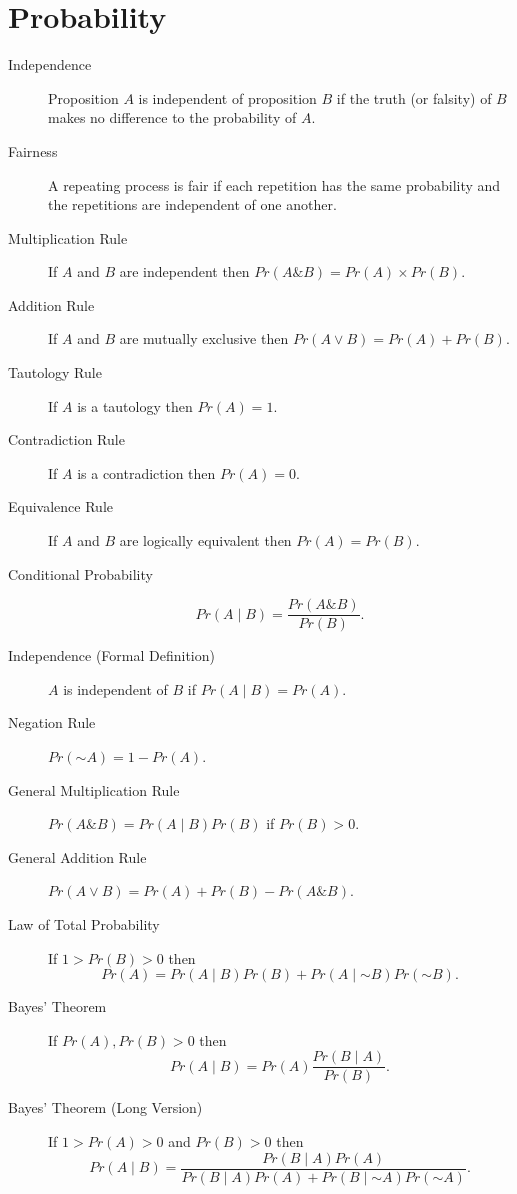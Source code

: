 \documentclass[justified]{tufte-book}
\newcommand{\given}{\mid}
\renewcommand{\neg}{\mathbin{\sim}}
\renewcommand{\wedge}{\mathbin{\&}}
\newcommand{\p}{Pr}
\theoremstyle{definition}
\theoremstyle{definition}
\theoremstyle{definition}
\theoremstyle{remark}
\begin{document}
\hypertarget{probability}{%
\section*{Probability}\label{probability}}

\begin{description}
\item[Independence]
Proposition \(A\) is independent of proposition \(B\) if the truth (or falsity) of \(B\) makes no difference to the probability of \(A\).
\item[Fairness]
A repeating process is fair if each repetition has the same probability and the repetitions are independent of one another.
\item[Multiplication Rule]
If \(A\) and \(B\) are independent then \(\p(A \wedge B) = \p(A) \times \p(B)\).
\item[Addition Rule]
If \(A\) and \(B\) are mutually exclusive then \(\p(A \vee B) = \p(A) + \p(B)\).
\item[Tautology Rule]
If \(A\) is a tautology then \(\p(A) = 1\).
\item[Contradiction Rule]
If \(A\) is a contradiction then \(\p(A) = 0\).
\item[Equivalence Rule]
If \(A\) and \(B\) are logically equivalent then \(\p(A) = \p(B)\).
\item[Conditional Probability]
\[\p(A \given B) = \frac{\p(A \wedge B)}{\p(B)}.\]
\item[Independence (Formal Definition)]
\(A\) is independent of \(B\) if \(\p(A \given B) = \p(A)\).
\item[Negation Rule]
\(\p(\neg A) = 1 - \p(A)\).
\item[General Multiplication Rule]
\(\p(A \wedge B) = \p(A \given B) \p(B)\) if \(\p(B) > 0\).
\item[General Addition Rule]
\(\p(A \vee B) = \p(A) + \p(B) - \p(A \wedge B)\).
\item[Law of Total Probability]
If \(1 > \p(B) > 0\) then \[\p(A) = \p(A \given B)\p(B) + \p(A \given \neg B)\p(\neg B).\]
\item[Bayes' Theorem]
If \(\p(A), \p(B) > 0\) then \[\p(A \given B) = \p(A) \frac{\p(B \given A)}{\p(B)}.\]
\item[Bayes' Theorem (Long Version)]
If \(1 > \p(A) > 0\) and \(\p(B) > 0\) then \[\p(A \given B) = \frac{\p(B \given A)\p(A)}{\p(B \given A)\p(A) + \p(B \given \neg A)\p(\neg A)}.\]
\end{description}
\end{document}

